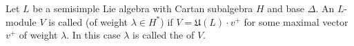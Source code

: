 Let $L$ be a semisimple Lie algebra with Cartan subalgebra $H$ and base $\Delta$. An $L$-module $V$ is called  (of weight $\lambda \in H^*$) if $V = \mathfrak{U}(L) \cdot v^+$ for some maximal vector $v^+$ of weight $\lambda$. In this case $\lambda$ is called the  of $V$.

